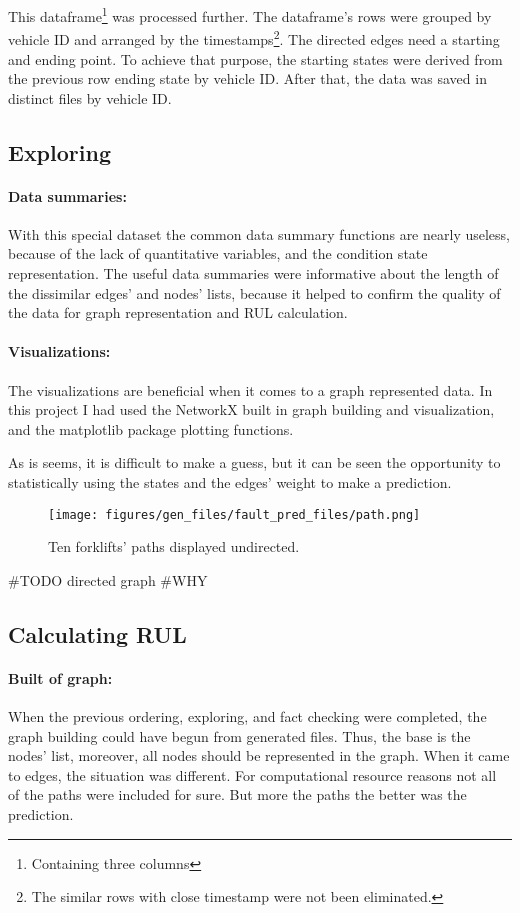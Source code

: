 This dataframe\footnote{Containing three columns} was processed further. The dataframe's rows were grouped by vehicle ID and arranged by the timestamps\footnote{The similar rows with close timestamp were not been eliminated.}.
The directed edges need a starting and ending point. To achieve that purpose, the starting states were derived from the previous row ending state by vehicle ID. After that, the data was saved in distinct files by vehicle ID.
	\subsection{Exploring}
		\paragraph{Data summaries:}
		With this special dataset the common data summary functions are nearly useless, because of the lack of quantitative variables, and the condition state representation.
		The useful data summaries were informative about the length of the dissimilar edges' and nodes' lists, because it helped to confirm the quality of the data for graph representation and RUL calculation. 

		\paragraph{Visualizations:}
		The visualizations are beneficial when it comes to a graph represented data. In this project I had used the NetworkX built in graph building and visualization, and the matplotlib package plotting functions.

		As is seems, it is difficult to make a guess, but it can be seen the opportunity to statistically using the states and the edges' weight to make a prediction.
			\begin{figure}[H]
			\centering
			\texttt{[image: figures/gen\_files/fault\_pred\_files/path.png]}
			\caption{Ten forklifts' paths displayed undirected.} 
			\end{figure}
		\#TODO directed graph
\#WHY	
	\subsection{Calculating RUL}
			\paragraph{Built of graph:}
			When the previous ordering, exploring, and fact checking were completed, the graph building could have begun from generated files. Thus, the base is the nodes' list, moreover, all nodes should be represented in the graph. When it came to edges, the situation was different. For computational resource reasons not all of the paths were included for sure. But more the paths the better was the prediction.
